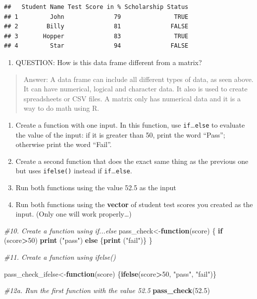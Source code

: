 \documentclass[
]{article}
\newenvironment{Shaded}{\begin{snugshade}}{\end{snugshade}}
\newcommand{\CommentTok}[1]{\textcolor[rgb]{0.56,0.35,0.01}{\textit{#1}}}
\newcommand{\ControlFlowTok}[1]{\textcolor[rgb]{0.13,0.29,0.53}{\textbf{#1}}}
\newcommand{\DecValTok}[1]{\textcolor[rgb]{0.00,0.00,0.81}{#1}}
\newcommand{\FloatTok}[1]{\textcolor[rgb]{0.00,0.00,0.81}{#1}}
\newcommand{\FunctionTok}[1]{\textcolor[rgb]{0.13,0.29,0.53}{\textbf{#1}}}
\newcommand{\NormalTok}[1]{#1}
\newcommand{\OtherTok}[1]{\textcolor[rgb]{0.56,0.35,0.01}{#1}}
\newcommand{\SpecialCharTok}[1]{\textcolor[rgb]{0.81,0.36,0.00}{\textbf{#1}}}
\newcommand{\StringTok}[1]{\textcolor[rgb]{0.31,0.60,0.02}{#1}}
\providecommand{\tightlist}{%
  \setlength{\itemsep}{0pt}\setlength{\parskip}{0pt}}
\begin{document}
\begin{verbatim}
##   Student Name Test Score in % Scholarship Status
## 1         John              79               TRUE
## 2        Billy              81              FALSE
## 3       Hopper              83               TRUE
## 4         Star              94              FALSE
\end{verbatim}

\begin{enumerate}
\def\labelenumi{\arabic{enumi}.}
\setcounter{enumi}{8}
\tightlist
\item
  QUESTION: How is this data frame different from a matrix?
\end{enumerate}

\begin{quote}
Answer: A data frame can include all different types of data, as seen
above. It can have numerical, logical and character data. It also is
used to create spreadsheets or CSV files. A matrix only has numerical
data and it is a way to do math using R.
\end{quote}

\begin{enumerate}
\def\labelenumi{\arabic{enumi}.}
\setcounter{enumi}{9}
\item
  Create a function with one input. In this function, use
  \texttt{if}\ldots{}\texttt{else} to evaluate the value of the input:
  if it is greater than 50, print the word ``Pass''; otherwise print the
  word ``Fail''.
\item
  Create a second function that does the exact same thing as the
  previous one but uses \texttt{ifelse()} instead if
  \texttt{if}\ldots{}\texttt{else}.
\item
  Run both functions using the value 52.5 as the input
\item
  Run both functions using the \textbf{vector} of student test scores
  you created as the input. (Only one will work properly\ldots)
\end{enumerate}

\begin{Shaded}
\begin{Highlighting}[]
\CommentTok{\#10. Create a function using if...else}
\NormalTok{pass\_check}\OtherTok{\textless{}{-}}\ControlFlowTok{function}\NormalTok{(score)}
\NormalTok{\{}
  \ControlFlowTok{if}\NormalTok{ (score}\SpecialCharTok{\textgreater{}}\DecValTok{50}\NormalTok{) }\FunctionTok{print}\NormalTok{ (}\StringTok{"pass"}\NormalTok{)}
  \ControlFlowTok{else}\NormalTok{ \{}\FunctionTok{print}\NormalTok{ (}\StringTok{"fail"}\NormalTok{)\}}
\NormalTok{\}}
  
\CommentTok{\#11. Create a function using ifelse()}

\NormalTok{pass\_check\_ifelse}\OtherTok{\textless{}{-}}\ControlFlowTok{function}\NormalTok{(score)}
\NormalTok{\{}\FunctionTok{ifelse}\NormalTok{(score}\SpecialCharTok{\textgreater{}}\DecValTok{50}\NormalTok{, }\StringTok{"pass"}\NormalTok{, }\StringTok{"fail"}\NormalTok{)\}}

\CommentTok{\#12a. Run the first function with the value 52.5}
\FunctionTok{pass\_check}\NormalTok{(}\FloatTok{52.5}\NormalTok{)}
\end{Highlighting}
\end{Shaded}
\end{document}
